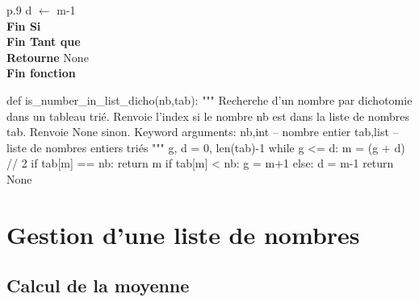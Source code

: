 \documentclass[10pt]{article}
\begin{document}
\begin{minipage}[c]{.48\linewidth}
\begin{pseudo}
\begin{center}
\begin{tabular}{p{.9\textwidth}}
\hspace{1.6cm}\textsf{d} $\leftarrow$ \textsf{m-1}\\
\hspace{.8cm} \textbf{Fin Si} \\
\hspace{.4cm}\textbf{Fin Tant que} \\
\hspace{.4cm}\textbf{Retourne} \textsf{None} \\
\textbf{Fin fonction} \\
\hline
\end{tabular}
\end{center}
\end{pseudo}
\end{minipage} \hfill
\begin{minipage}[c]{.48\linewidth}
\begin{py}
\begin{python}
def is_number_in_list_dicho(nb,tab):
    """ 
    Recherche d'un nombre par dichotomie dans un 
    tableau trié. 
    Renvoie l'index si le nombre nb est dans la liste 
    de nombres tab.
    Renvoie None sinon.
    Keyword arguments:
    nb,int -- nombre entier
    tab,list -- liste de nombres entiers triés
    """
    g, d = 0, len(tab)-1
    while g <= d:
        m = (g + d) // 2
        if tab[m] == nb:
            return m
        if tab[m] < nb:
            g = m+1
        else:
            d = m-1
    return None
\end{python}
\end{py}
\end{minipage}

\section{Gestion d'une liste de nombres}
\subsection{Calcul de la moyenne}
\end{document}
